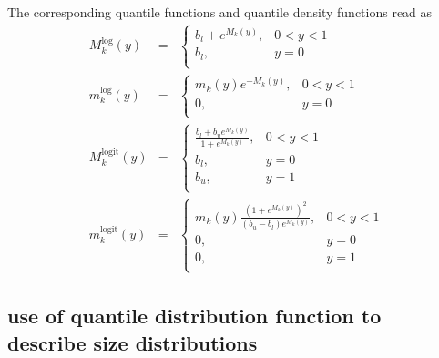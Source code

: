 The corresponding quantile functions and quantile density functions read as
\begin{eqnarray}
   M_k^{\log}(y) &=&  \left\{{\begin{array}{ll}
    b_l+e^{M_k(y)}, & 0<y<1 \\
    b_l, & y=0\\
    \end{array}}\right. \label{eq:MkLog}\\
   m_k^{\log}(y) &=&  \left\{{\begin{array}{ll}
    m_k(y)e^{-M_k(y)}, & 0<y<1 \\
    0, & y=0\\
    \end{array}}\right. \label{eq:mkLog}\\
   M_k^{\mathrm{logit}}(y) &=&  \left\{{\begin{array}{ll}
    \frac{b_l+b_ue^{M_k(y)}}{1+e^{M_k(y)}}, & 0<y<1 \\
    b_l, & y=0\\
    b_u, & y=1\\
    \end{array}}\right. \label{eq:MkLogit}\\
   m_k^{\mathrm{logit}}(y) &=&  \left\{{\begin{array}{ll}
    m_k(y)\frac{\left(1+e^{M_k(y)}\right)^2}{(b_u-b_l)e^{M_k(y)}}, & 0<y<1 \\
    0, & y=0\\
    0, & y=1\\
    \end{array}}\right. \label{eq:mkLogit}
 \end{eqnarray}

\subsection{use of quantile distribution function to describe size distributions} ~\\

